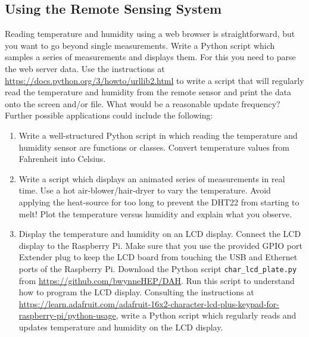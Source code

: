 \subsection{Using the Remote Sensing System}

Reading temperature and humidity using a web browser is straightforward, but you want to go beyond single measurements.
Write a Python script which samples a series of measurements and displays them.
For this you need to parse the web server data.
Use the instructions at \url{https://docs.python.org/3/howto/urllib2.html} to write a script that will regularly read the temperature and humidity from the remote sensor and print the data onto the screen and/or file.
What would be a reasonable update frequency?
Further possible applications could include the following:

\begin{enumerate}

\item Write a well-structured Python script in which reading the temperature and humidity sensor are functions or classes.
Convert temperature values from Fahrenheit into Celsius.

\item Write a script which displays an animated series of measurements in real time.
Use a hot air-blower/hair-dryer to vary the temperature.
Avoid applying the heat-source for too long to prevent the DHT22 from starting to melt!
Plot the temperature versus humidity and explain what you observe.
 
\item Display the temperature and humidity on an LCD display. 
Connect the LCD display to the Raspberry Pi. 
Make sure that you use the provided GPIO port Extender plug to keep the LCD board from touching the USB and Ethernet ports of the Raspberry Pi.
Download the Python script \texttt{char\_lcd\_plate.py} from \url{https://github.com/bwynneHEP/DAH}.
Run this script to understand how to program the LCD display.
Consulting the instructions at \url{https://learn.adafruit.com/adafruit-16x2-character-lcd-plus-keypad-for-raspberry-pi/python-usage}, write a Python script which regularly reads and updates temperature and humidity on the LCD display.

\end{enumerate}

